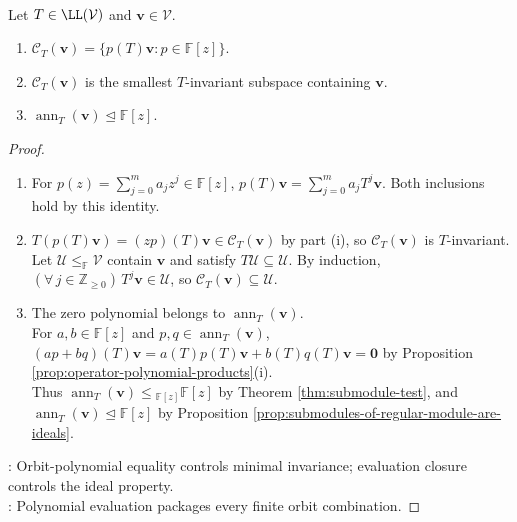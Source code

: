 \begin{proposition} \label{prop:cyclic-subspace-smallest-invariant-subspace} \\
Let $T\in\LL(\mathcal{V})$ and $\mathbf{v}\in\mathcal{V}$.
\begin{enumerate}[label=(\roman*)]
\setlength{\itemsep}{0pt}
\item $\mathcal{C}_T(\mathbf{v})=\{p(T)\mathbf{v}:p\in\mathbb{F}[z]\}$.
\item $\mathcal{C}_T(\mathbf{v})$ is the smallest $T$-invariant subspace containing $\mathbf{v}$.
\item $\operatorname{ann}_T(\mathbf{v})\trianglelefteq\mathbb{F}[z]$.
\end{enumerate}
\begin{proof}
\begin{enumerate}[label=(\roman*)]
\setlength{\itemsep}{0pt}
\item For $p(z)=\sum\limits_{j=0}^{m}a_jz^j\in\mathbb{F}[z]$, $p(T)\mathbf{v}=\sum\limits_{j=0}^{m}a_jT^j\mathbf{v}$. Both inclusions hold by this identity.
\item $T(p(T)\mathbf{v})=(zp)(T)\mathbf{v}\in\mathcal{C}_T(\mathbf{v})$ by part (i), so $\mathcal{C}_T(\mathbf{v})$ is $T$-invariant.\\
Let $\mathcal{U}\leq_{\mathbb{F}}\mathcal{V}$ contain $\mathbf{v}$ and satisfy $T\mathcal{U}\subseteq\mathcal{U}$. By induction, $(\forall\,j\in\mathbb{Z}_{\geq0})\,T^j\mathbf{v}\in\mathcal{U}$, so $\mathcal{C}_T(\mathbf{v})\subseteq\mathcal{U}$.
\item The zero polynomial belongs to $\operatorname{ann}_T(\mathbf{v})$.\\
For $a,b\in\mathbb{F}[z]$ and $p,q\in\operatorname{ann}_T(\mathbf{v})$, $(ap+bq)(T)\mathbf{v}=a(T)p(T)\mathbf{v}+b(T)q(T)\mathbf{v}=\mathbf{0}$ by Proposition \ref{prop:operator-polynomial-products}(i).\\
Thus $\operatorname{ann}_T(\mathbf{v})\leq{}_{\mathbb{F}[z]}\mathbb{F}[z]$ by Theorem \ref{thm:submodule-test}, and $\operatorname{ann}_T(\mathbf{v})\trianglelefteq\mathbb{F}[z]$ by Proposition \ref{prop:submodules-of-regular-module-are-ideals}.
\end{enumerate}
: Orbit-polynomial equality controls minimal invariance; evaluation closure controls the ideal property.\\
: Polynomial evaluation packages every finite orbit combination.
\end{proof}
\end{proposition}

